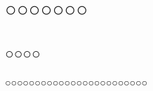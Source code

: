 \chapter{○○○○○○○}
\newcommand\Binom[2]{\bigg(\begin{array}{@{\,}c@{\,}}#1\\[-.5mm]#2\end{array}\bigg)}

\section{○○○○}


○○○○○○○○○○○○○○○○○○○○○○○○

